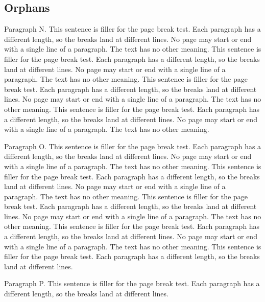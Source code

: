 \subsection{Orphans}

Paragraph N. This sentence is filler for the page break test. Each paragraph
has a different length, so the breaks land at different lines. No page may
start or end with a single line of a paragraph. The text has no other meaning.
This sentence is filler for the page break test. Each paragraph has a
different length, so the breaks land at different lines. No page may start or
end with a single line of a paragraph. The text has no other meaning. This
sentence is filler for the page break test. Each paragraph has a different
length, so the breaks land at different lines. No page may start or end with a
single line of a paragraph. The text has no other meaning. This sentence is
filler for the page break test. Each paragraph has a different length, so the
breaks land at different lines. No page may start or end with a single line of
a paragraph. The text has no other meaning.

Paragraph O. This sentence is filler for the page break test. Each paragraph
has a different length, so the breaks land at different lines. No page may
start or end with a single line of a paragraph. The text has no other meaning.
This sentence is filler for the page break test. Each paragraph has a
different length, so the breaks land at different lines. No page may start or
end with a single line of a paragraph. The text has no other meaning. This
sentence is filler for the page break test. Each paragraph has a different
length, so the breaks land at different lines. No page may start or end with a
single line of a paragraph. The text has no other meaning. This sentence is
filler for the page break test. Each paragraph has a different length, so the
breaks land at different lines. No page may start or end with a single line of
a paragraph. The text has no other meaning. This sentence is filler for the
page break test. Each paragraph has a different length, so the breaks land at
different lines.

Paragraph P. This sentence is filler for the page break test. Each paragraph
has a different length, so the breaks land at different lines.

